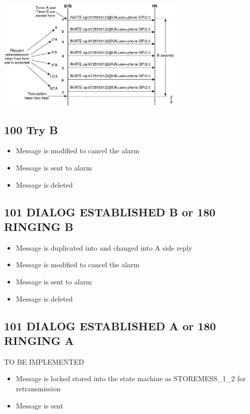 \documentclass[a4paper]{report}
\begin{document}
\includegraphics[width=90mm]{timerAlogic.eps}

\subsection{100 Try B}
\begin {itemize}
\item Message is modified to cancel the alarm
\item Message is sent to alarm
\item Message is deleted
\end{itemize}

\subsection{101 DIALOG ESTABLISHED B or 180 RINGING B}
\begin {itemize}
\item Message is duplicated into and changed into A side reply
\item Message is modified to cancel the alarm
\item Message is sent to alarm
\item Message is deleted
\end{itemize}

\subsection{101 DIALOG ESTABLISHED A or 180 RINGING A}
TO BE IMPLEMENTED
\begin {itemize}
\item Message is locked stored into the state machine as STOREMESS\_1\_2 for retransmission 
\item Message is sent
\end{itemize}
\end{document}
